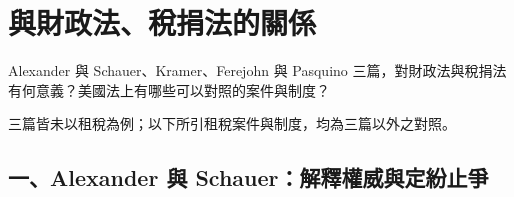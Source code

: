 \chapter{與財政法、稅捐法的關係}
\label{ch:55_fiscal}

\begin{qaquestion}
Alexander 與 Schauer、Kramer、Ferejohn 與 Pasquino 三篇，對財政法與稅捐法有何意義？美國法上有哪些可以對照的案件與制度？
\end{qaquestion}

三篇皆未以租稅為例；以下所引租稅案件與制度，均為三篇以外之對照。

\section{一、Alexander 與 Schauer：解釋權威與定紛止爭}
\label{sec:55_fiscal-1}


